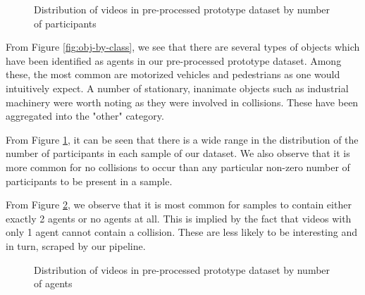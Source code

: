 \documentclass[letterpaper, 10 pt, conference]{ieeeconf}
\begin{document}
\begin{figure}[!h]
    \centering
    \caption{Distribution of videos in pre-processed prototype dataset by number of participants}
    \label{fig:vids-by-participant}
\end{figure}

From Figure \ref{fig:obj-by-class}, we see that there are several types of objects which have been identified as agents in our pre-processed prototype dataset. Among these, the most common are motorized vehicles and pedestrians as one would intuitively expect. A number of stationary, inanimate objects such as industrial machinery were worth noting as they were involved in collisions. These have been aggregated into the "other" category.

From Figure \ref{fig:vids-by-participant}, it can be seen that there is a wide range in the distribution of the number of participants in each sample of our dataset. We also observe that it is more common for no collisions to occur than any particular non-zero number of participants to be present in a sample.

From Figure \ref{fig:vids-by-agents}, we observe that it is most common for samples to contain either exactly 2 agents or no agents at all. This is implied by the fact that videos with only 1 agent cannot contain a collision. These are less likely to be interesting and in turn, scraped by our pipeline.

\begin{figure}[!h]
    \centering
    \caption{Distribution of videos in pre-processed prototype dataset by number of agents}
    \label{fig:vids-by-agents}
\end{figure}
\end{document}
